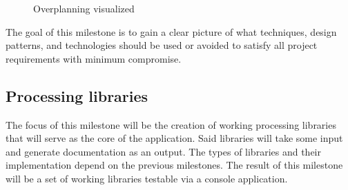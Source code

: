 \begin{figure}[H]
    \centering
    \caption{Overplanning visualized}
    \label{fig:overplanning}
\end{figure}

The goal of this milestone is to gain a clear picture of what techniques, design patterns, and technologies should be used or avoided to satisfy all project requirements with minimum compromise.




\subsection*{Processing libraries} \label{subSecProcessingLibs}

The focus of this milestone will be the creation of working processing libraries that will serve as the core of the application. Said libraries will take some input and generate documentation as an output. The types of libraries and their implementation depend on the previous milestones. The result of this milestone will be a set of working libraries testable via a console application.

